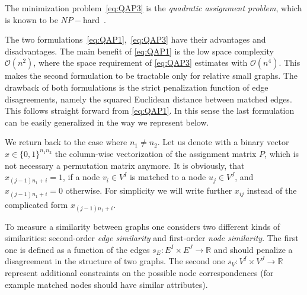 The minimization problem~\eqref{eq:QAP3} is the \emph{quadratic assignment problem}, which is known to be $NP-$hard~\cite{Burkard98thequadratic,Sahni1974}.

The two formulations~\eqref{eq:QAP1},~\eqref{eq:QAP3} have their advantages and disadvantages. The main benefit of \eqref{eq:QAP1} is the low space complexity $\mathcal O(n^2)$, where the space requirement of \eqref{eq:QAP3} estimates with $\mathcal O(n^4)$. This makes the second formulation to be tractable only for relative small graphs. The drawback of both formulations is the strict penalization function of edge disagreements, namely the squared Euclidean distance between matched edges. This follows straight forward from \eqref{eq:QAP1}. In this sense the last formulation can be easily generalized in the way we represent below. 

We return back to the case where $n_1\not=n_2$. Let us denote with a binary vector $x\in \{0,1\}^{n_1n_2}$ the column-wise vectorization of the assignment matrix $P$, which is not necessary a permutation matrix anymore. It is obviously, that $x_{(j-1)n_1+i}=1$, if a node $v_i\in V^I$ is matched to a node $u_j\in V^J$, and $x_{(j-1)n_1+i}=0$ otherwise. For simplicity we will write further $x_{ij}$ instead of the complicated form $x_{(j-1)n_1+i}$.
 

To measure a similarity between graphs one considers two different kinds of similarities: second-order \emph{edge similarity} and first-order \emph{node similarity}. The first one is defined as a function of the edges $s_E:E^I\times E^J\rightarrow\mathbb{R}$ and should penalize a disagreement in the structure of two graphs. The second one $s_V:V^I\times V^J\rightarrow\mathbb{R}$ represent additional constraints on the possible node correspondences (for example matched nodes should have similar attributes).



